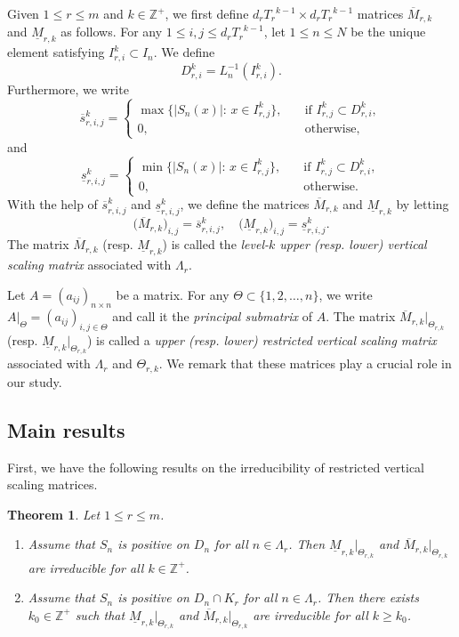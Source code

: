 \documentclass[11pt]{amsart}
\newtheorem{thm}{Theorem}[section]
\theoremstyle{definition}
\theoremstyle{remark}
\numberwithin{equation}{section}
\newcommand{\Z}{{\mathbb Z}}
\newcommand{\upM}{{\overline{M}}}
\newcommand{\lowM}{{\underline{M}}}
\newcommand{\ups}{{\overline{s} }}
\newcommand{\lows}{{\underline{s}}}
\begin{document}
Given $1\leq r\leq m$ and $k \in \mathbb{Z}^+$, we first define $d_r {T_r}^{k-1} \times d_r {T_r}^{k-1}$ matrices $\upM_{r,k}$ and $\lowM_{r,k}$ as follows.
For any $1 \leq i,j \leq d_r {T_r}^{k-1}$, let $1 \leq n \leq N$ be the unique element satisfying $I_{r,i}^k \subset I_{n}$. We define 
\[D_{r,i}^k=L_n^{-1}(I_{r,i}^k).\] 
Furthermore, we write
\begin{equation*}
	\ups_{r,i,j}^{k}= 
	\begin{cases}
		\max \big\{ \big| S_{n}(x) \big|:\, x \in   I_{r,j}^k\big\}, \quad & \mbox{if } I_{r,j}^k \subset D_{r,i}^k , \\
		0 ,\quad & \mbox{otherwise},
	\end{cases}
\end{equation*}
and
\begin{equation*}
	\lows_{r,i,j}^{k}=
	\begin{cases}
		\min \big\{ \big| S_{n}(x) \big|:\, x \in   I_{r,j}^k\big\} ,\quad & \mbox{if }  I_{r,j}^k \subset D_{r,i}^k, \\
		0 ,\quad & \mbox{otherwise}.
	\end{cases}
\end{equation*}
With the help of $\ups_{r,i,j}^{k}$ and $\lows_{r,i,j}^{k}$, we define the matrices $\upM_{r,k}$ and $\lowM_{r,k}$ by letting
$$\big(\upM_{r,k} \big)_{i,j} = \ups_{r,i,j}^k, \quad \big(\lowM_{r,k} \big)_{i,j} = \lows_{r,i,j}^k.$$
The matrix $\upM_{r,k}$ (resp. $\lowM_{r,k}$) is called the \emph{level-$k$ upper (resp. lower) vertical scaling matrix} associated with $\Lambda_r$. 



Let $A=(a_{ij})_{n \times n}$ be a matrix. For any $ \Theta \subset \{1,2,\ldots,n\}$, we write $A|_\Theta=(a_{ij})_{i,j \in \Theta}$ and call it the \emph{principal submatrix} of $A$. The matrix $\upM_{r,k}|_{\Theta_{r,k}}$ (resp. $\lowM_{r,k}|_{\Theta_{r,k}}$) is called a \emph{upper (resp. lower) restricted vertical scaling matrix} associated with $\Lambda_r$ and $\Theta_{r,k}$. We remark that these matrices play a crucial role in our study.


\subsection{Main results}
First, we have the following results on the irreducibility of restricted vertical scaling matrices.


\begin{thm}\label{thm:irr}
	Let $1\leq r\leq m$. 
	\begin{enumerate}
		\item 	Assume that $S_n$ is positive on $D_n$ for all $n\in\Lambda_r$. Then $\lowM_{r,k}|_{\Theta_{r,k}}$ and $\upM_{r,k}|_{\Theta_{r,k}}$ are irreducible for all $k \in \Z^+$. 
		\item Assume that $S_n$ is positive on $D_n\cap K_r$ for all $n\in\Lambda_r$. Then there exists $k_0 \in \Z^+$ such that $\lowM_{r,k}|_{\Theta_{r,k}}$ and $\upM_{r,k}|_{\Theta_{r,k}}$ are irreducible for all $k \geq k_0$.
	\end{enumerate}
\end{thm}
\end{document}
